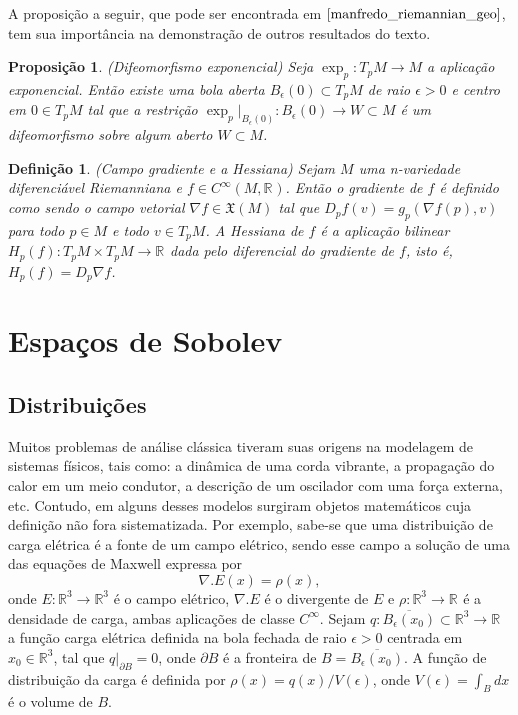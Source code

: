 \documentclass[12pt]{book}
\newtheorem{definicao}[teorema]{Definição}
\newtheorem{proposicao}[teorema]{Proposição}
\newcommand{\campossuaves}[1]{\mathfrak{X}(#1)}
\newcommand{\espacotangenteponto}[2]{T_{#1}#2}
\newcommand{\funcoessuaves}[1]{C^{\infty}(#1, \real{})}
\newcommand{\gradiente}{\nabla f}
\newcommand{\real}[1]{\mathbb{R}^{#1}}
\newcommand{\reta}{\real{}}
\begin{document}
	A proposição a seguir, que pode ser encontrada em $\cite{manfredo_riemannian_geo}$, tem sua importância na demonstração de outros resultados do texto.
	
	\begin{proposicao}\label{proposicao_difeomorfismo_exponencial}
		(Difeomorfismo exponencial) Seja  $\exp_{p}:T_{p}M \to M$ a aplicação exponencial. Então existe uma bola aberta $B_{\epsilon}(0) \subset \espacotangenteponto{p}{M}$ de raio $\epsilon>0$ e centro em $0 \in T_{p}M$ tal que a restrição $\exp_{p}|_{B_{\epsilon}(0)}:B_{\epsilon}(0) \to W \subset M$ é um difeomorfismo sobre algum aberto $W \subset M$.
	\end{proposicao}
	
	\begin{definicao}\label{definicao_gradiente_hessiana}
		(Campo gradiente e a Hessiana) Sejam $M$ uma n-variedade diferenciável Riemanniana e $f\in \funcoessuaves{M}$. Então o gradiente de $f$ é definido como sendo o campo vetorial $\gradiente \in \campossuaves{M}$ tal que $D_{p}f(v) = g_{p}(\gradiente(p), v)$ para todo $p\in M$ e todo $v \in T_{p}M$. A Hessiana de $f$ é a aplicação bilinear $H_{p}(f): T_{p}M\times T_{p}M \to \reta$ dada pelo diferencial do gradiente de $f$, isto é, $H_{p}(f) = D_{p}\gradiente$.
	\end{definicao}
	
	
	\chapter{Espaços de Sobolev}
	\section{Distribuições}\label{secao_distribuicoes}
	Muitos problemas de análise clássica tiveram suas origens na modelagem de sistemas físicos, tais como: a dinâmica de uma corda vibrante, a propagação do calor em um meio condutor, a descrição de um oscilador com uma força externa, etc. Contudo, em alguns desses modelos surgiram objetos matemáticos cuja definição não fora sistematizada. Por exemplo, sabe-se que uma distribuição de carga elétrica é a fonte de um campo elétrico, sendo esse campo a solução de uma das equações de Maxwell expressa por
	$$
	\nabla.E(x) = \rho(x),
	$$
	onde $E:\real{3} \to \real{3} $ é o campo elétrico, $\nabla.E$ é o divergente de $E$ e $\rho:\real{3}\to \reta$ é a densidade de carga, ambas aplicações de classe $C^{\infty}$. Sejam $q:\overline{B_{\epsilon}(x_{0})} \subset \real{3}\to \reta$ a função carga elétrica definida na bola fechada de raio $\epsilon>0$ centrada em $x_{0}\in \real{3}$, tal que $q|_{\partial B} = 0$, onde $\partial B$ é a fronteira de $B=\overline{B_{\epsilon}(x_{0})}$. A função de distribuição da carga é definida por $\rho(x)=q(x)/V(\epsilon)$, onde $V(\epsilon)=\int_{B}dx$ é o volume de $B$.
	
\end{document}
